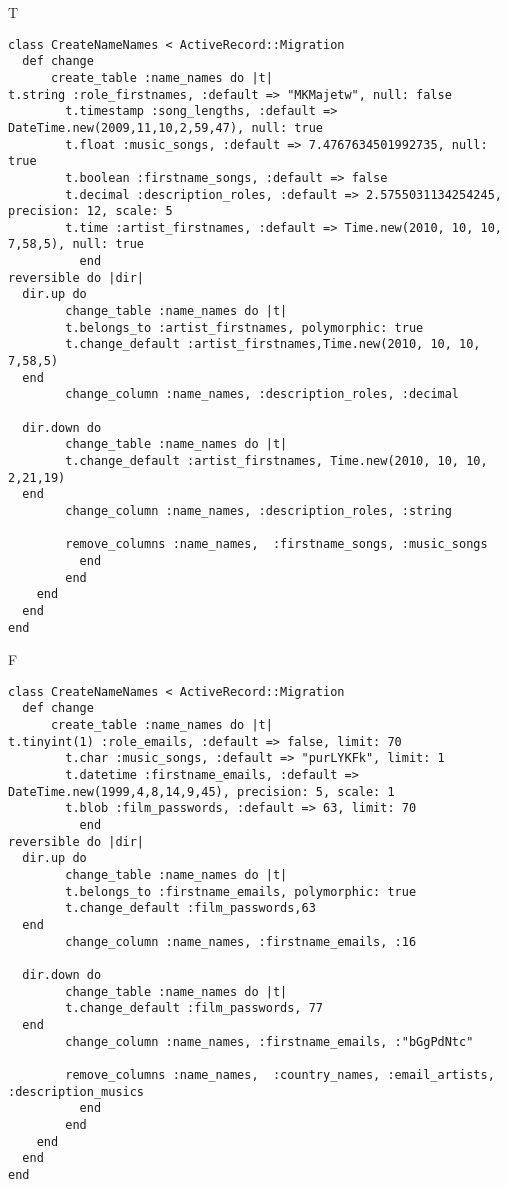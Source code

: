 T
\begin{verbatim}
class CreateNameNames < ActiveRecord::Migration
  def change
	  create_table :name_names do |t|
t.string :role_firstnames, :default => "MKMajetw", null: false
		t.timestamp :song_lengths, :default => DateTime.new(2009,11,10,2,59,47), null: true
		t.float :music_songs, :default => 7.4767634501992735, null: true
		t.boolean :firstname_songs, :default => false
		t.decimal :description_roles, :default => 2.5755031134254245, precision: 12, scale: 5
		t.time :artist_firstnames, :default => Time.new(2010, 10, 10, 7,58,5), null: true
		  end
reversible do |dir|
  dir.up do
		change_table :name_names do |t|
		t.belongs_to :artist_firstnames, polymorphic: true
 		t.change_default :artist_firstnames,Time.new(2010, 10, 10, 7,58,5)
  end
 		change_column :name_names, :description_roles, :decimal
   
  dir.down do
		change_table :name_names do |t|
		t.change_default :artist_firstnames, Time.new(2010, 10, 10, 2,21,19)
  end
 		change_column :name_names, :description_roles, :string
   
		remove_columns :name_names,  :firstname_songs, :music_songs 
	      end
	    end
    end 
  end
end

\end{verbatim}

F
\begin{verbatim}
class CreateNameNames < ActiveRecord::Migration
  def change
	  create_table :name_names do |t|
t.tinyint(1) :role_emails, :default => false, limit: 70
		t.char :music_songs, :default => "purLYKFk", limit: 1
		t.datetime :firstname_emails, :default => DateTime.new(1999,4,8,14,9,45), precision: 5, scale: 1
		t.blob :film_passwords, :default => 63, limit: 70
		  end
reversible do |dir|
  dir.up do
		change_table :name_names do |t|
		t.belongs_to :firstname_emails, polymorphic: true
 		t.change_default :film_passwords,63
  end
 		change_column :name_names, :firstname_emails, :16
   
  dir.down do
		change_table :name_names do |t|
		t.change_default :film_passwords, 77
  end
 		change_column :name_names, :firstname_emails, :"bGgPdNtc"
   
		remove_columns :name_names,  :country_names, :email_artists, :description_musics 
	      end
	    end
    end 
  end
end

\end{verbatim}

